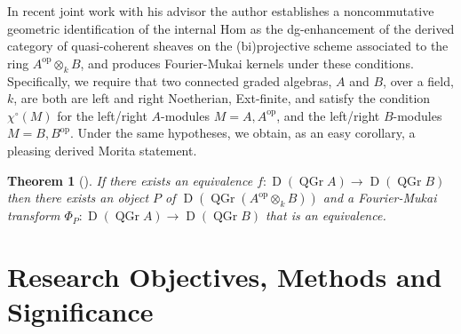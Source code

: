 \documentclass[11pt]{article}
\newtheorem{theorem}{Theorem}[section]
\begin{document}
In recent joint work with his advisor \cite{BF17} the author establishes a noncommutative geometric identification of the internal Hom as the dg-enhancement of the derived category of quasi-coherent sheaves on the (bi)projective scheme associated to the ring $A^{\operatorname{op}} \otimes_k B$, and produces Fourier-Mukai kernels under these conditions.
Specifically, we require that two connected graded algebras, $A$ and $B$, over a field, $k$, are both are left and right Noetherian, Ext-finite, and satisfy the condition $\chi^\circ(M)$ for the left/right $A$-modules $M = A, A^{\operatorname{op}}$, and the left/right $B$-modules $M = B, B^{\operatorname{op}}$.
Under the same hypotheses, we obtain, as an easy corollary, a pleasing derived Morita statement.
\begin{theorem}[\cite{BF17}]
  If there exists an equivalence
  $f \colon \operatorname{D}(\operatorname{QGr} A) \to \operatorname{D}(\operatorname{QGr} B)$
  then there exists an object $P$ of $\operatorname{D}\left(\operatorname{QGr} \left(A^{\operatorname{op}} \otimes_k B\right)\right)$ and a Fourier-Mukai transform
  $\Phi_P \colon \operatorname{D}(\operatorname{QGr} A) \to \operatorname{D}(\operatorname{QGr} B)$
  that is an equivalence.
\end{theorem}



\section{Research Objectives, Methods and Significance}
\end{document}
